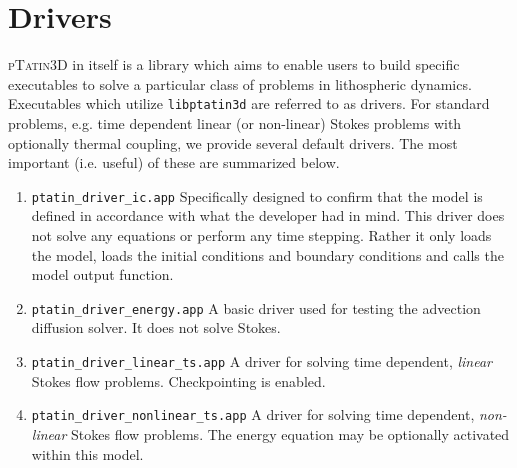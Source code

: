 \documentclass[paper=a4, fontsize=11pt,twoside]{scrartcl}
\newcommand{\ptat}{{{\textsc{pTatin3D}}}}
\newcommand{\unix}[1]{\texttt{\footnotesize #1}}
\begin{document}
{{%
\newpage
\section{Drivers}
{\ptat} in itself is a library which aims to enable users to build specific executables to solve a particular class of problems in lithospheric dynamics.
Executables which utilize \unix{libptatin3d} are referred to as drivers.
For standard problems, e.g. time dependent linear (or non-linear) Stokes problems with optionally thermal coupling, we provide several default drivers.
The most important (i.e. useful) of these are summarized below.

\begin{enumerate}
	\item \unix{ptatin\_driver\_ic.app}
	Specifically designed to confirm that the model is defined in accordance with what the developer had in mind. This driver does not solve any equations or perform any time stepping. Rather it only loads the model, loads the initial conditions and boundary conditions and calls the model output function.
	
	\item \unix{ptatin\_driver\_energy.app}
	A basic driver used for testing the advection diffusion solver. It does not solve Stokes.
	
	\item \unix{ptatin\_driver\_linear\_ts.app}
	A driver for solving time dependent, \emph{linear} Stokes flow problems. Checkpointing is enabled.

	\item \unix{ptatin\_driver\_nonlinear\_ts.app}
	A driver for solving time dependent, \emph{non-linear} Stokes flow problems. The energy equation may be optionally activated within this model.
\end{enumerate}

}}
\end{document}
